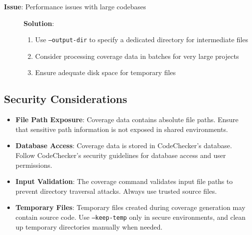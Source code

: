 \begin{description}
    \item[\textbf{Issue}: Performance issues with large codebases]
    \textbf{Solution}: 
    \begin{enumerate}
        \item Use \texttt{--output-dir} to specify a dedicated directory for intermediate files
        \item Consider processing coverage data in batches for very large projects
        \item Ensure adequate disk space for temporary files
    \end{enumerate}
\end{description}

\subsection{Security Considerations}

\begin{itemize}
    \item \textbf{File Path Exposure}: Coverage data contains absolute file paths. Ensure that sensitive path information is not exposed in shared environments.
    
    \item \textbf{Database Access}: Coverage data is stored in CodeChecker's database. Follow CodeChecker's security guidelines for database access and user permissions.
    
    \item \textbf{Input Validation}: The coverage command validates input file paths to prevent directory traversal attacks. Always use trusted source files.
    
    \item \textbf{Temporary Files}: Temporary files created during coverage generation may contain source code. Use \texttt{--keep-temp} only in secure environments, and clean up temporary directories manually when needed.
\end{itemize}